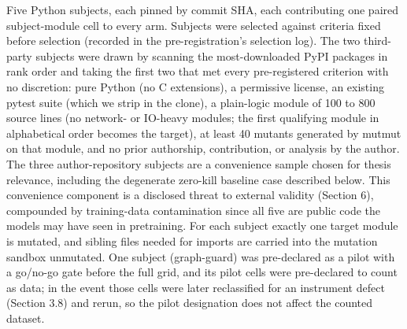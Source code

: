 \documentclass[
  11pt,
]{article}
\begin{document}
Five Python subjects, each pinned by commit SHA, each contributing one
paired subject-module cell to every arm. Subjects were selected against
criteria fixed before selection (recorded in the pre-registration's
selection log). The two third-party subjects were drawn by scanning the
most-downloaded PyPI packages in rank order and taking the first two
that met every pre-registered criterion with no discretion: pure Python
(no C extensions), a permissive license, an existing pytest suite (which
we strip in the clone), a plain-logic module of 100 to 800 source lines
(no network- or IO-heavy modules; the first qualifying module in
alphabetical order becomes the target), at least 40 mutants generated by
mutmut on that module, and no prior authorship, contribution, or
analysis by the author. The three author-repository subjects are a
convenience sample chosen for thesis relevance, including the degenerate
zero-kill baseline case described below. This convenience component is a
disclosed threat to external validity (Section 6), compounded by
training-data contamination since all five are public code the models
may have seen in pretraining. For each subject exactly one target module
is mutated, and sibling files needed for imports are carried into the
mutation sandbox unmutated. One subject (graph-guard) was pre-declared
as a pilot with a go/no-go gate before the full grid, and its pilot
cells were pre-declared to count as data; in the event those cells were
later reclassified for an instrument defect (Section 3.8) and rerun, so
the pilot designation does not affect the counted dataset.
\end{document}
